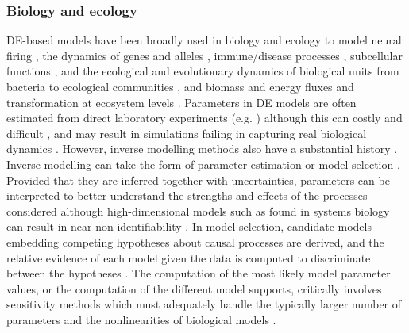 \subsubsection{Biology and ecology}

DE-based models have been broadly used in biology and ecology to model neural firing \cite{hodgkin1952quantitative}, the dynamics of genes and alleles \cite{Page2002}, immune/disease processes \cite{colijn2006high}, subcellular functions \cite{brown2003statistical}, and the ecological and evolutionary dynamics of biological units from bacteria to ecological communities \cite{Gabor2015, Lion2018, Villa2021, Boussange2022, boussange2023a, Akesson2021, chalmandrier2021, VandenBerg2022}, and biomass and energy fluxes and transformation at ecosystem levels \cite{Weng2015, Schartau2017, Franklin2020, Geary2020}.
Parameters in DE models are often estimated from direct laboratory experiments (e.g. \cite{hodgkin1952quantitative}) although this can costly and difficult \cite{Schartau2017}, and may result in simulations failing in capturing real biological dynamics \cite{Watts2001}. 
However, inverse modelling methods also have a substantial history \cite{ding2000h, fussmann2000crossing, alsos2023, pantel2023}.
Inverse modelling can take the form of parameter estimation \cite{ramsay2007parameter,ramsay2017dynamic,Schartau2017} or model selection \cite{Johnson2004,zhang2015selection}.
Provided that they are inferred together with uncertainties, parameters can be interpreted to better understand the strengths and effects of the processes considered \cite{Pontarp2019, Higgins2010, Curtsdotter2019, godwin2020} although high-dimensional models such as found in systems biology can result in near non-identifiability \cite{transtrum2011geometry}.
In model selection, candidate models embedding competing hypotheses about causal processes are derived, and the relative evidence of each model given the data is computed to discriminate between the hypotheses \cite{Johnson2004, alsos2023}.
The computation of the most likely model parameter values, or the computation of the different model supports, critically involves sensitivity methods which must adequately handle the typically larger number of parameters and the nonlinearities of biological models \cite{transtrum2011geometry,Gabor2015}.

